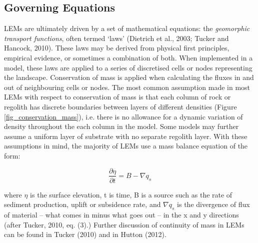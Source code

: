 \subsection{Governing Equations}

LEMs are ultimately driven by a set of mathematical equations: the \textit{geomorphic transport functions}, often termed `laws' (Dietrich et al., 2003; Tucker and Hancock, 2010). These laws may be derived from physical first principles, empirical evidence, or sometimes a combination of both. When implemented in a model, these laws are applied to a series of discretised cells or nodes representing the landscape. Conservation of mass is applied when calculating the fluxes in and out of neighbouring cells or nodes. The most common assumption made in most LEMs with respect to conservation of mass is that each column of rock or regolith has discrete boundaries between layers of different densities (Figure \ref{fig_conservation_mass}), i.e. there is no allowance for a dynamic variation of density throughout the each column in the model. Some models may further assume a uniform layer of substrate with no separate regolith layer. With these assumptions in mind, the majority of LEMs use a mass balance equation of the form:

\begin{equation*}
\frac{{\partial}\eta }{{\partial}t}=B-{\nabla}q_s
\end{equation*}

\noindent
where $\eta $ is the surface elevation, t is time, B is a source such as the rate of sediment production, uplift or subsidence rate, and  ${\nabla}q_s$ is the divergence of flux of material – what comes in minus what goes out – in the x and y directions (after Tucker, 2010, eq. (3).) Further discussion of continuity of mass in LEMs can be found in Tucker (2010) and in Hutton (2012). 

